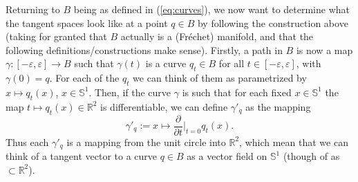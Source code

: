 \documentclass[a4,danish]{article}
\newcommand{\R}{\mathbb{R}}
\renewcommand{\S}{\mathbb{S}}
\renewcommand{\epsilon}{\varepsilon}
\begin{document}
Returning to $B$ being as defined in (\ref{eq:curves}), we now
want to determine what the tangent spaces look like at a point $q \in B$ by
following the construction above (taking for
granted that $B$ actually is a (Fr\'echet) manifold, and
that the following definitions/constructions make sense). Firstly, a
path in $B$ is now a map $\gamma\colon [-\epsilon,\epsilon] \rightarrow B$ such that
$\gamma(t)$ is a curve $q_t \in B$ for all $t \in
[-\epsilon,\epsilon]$, with $\gamma(0) =q$. For each of the $q_t$ we
can think of them as parametrized by $x \mapsto q_t(x)$, $x \in
\S^1$. Then, if the curve $\gamma$ is such that for each fixed
$x \in \S^1 $ the map $t \mapsto q_{t}(x) \in \R^2$ is differentiable,
we can define $\gamma'_q$ as the mapping
\begin{equation*}
  \gamma'_q := x \mapsto \frac{\partial }{\partial t} \bigg\vert_{t=0}q_t(x).
\end{equation*}
Thus each $\gamma'_q$ is a mapping from the unit circle into $\R^2$,
which mean that we can think of a tangent vector to a curve $q \in B$
as a vector field on $\S^1$ (though of as $\subset \R^2$).
\end{document}
